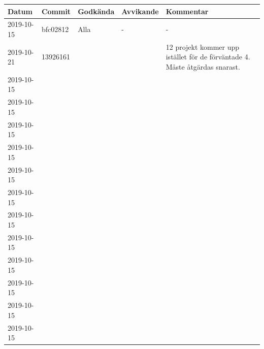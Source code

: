 \documentclass{TDP003mall}
\begin{document}
\begin{tabular}{|l|l|l|l|l|}
  \hline
  Datum & Commit & Godkända & Avvikande & Kommentar \\ [0.5ex]
  \hline
  2019-10-15 & bfc02812 & Alla & - & - \\
  \hline
  \hline
  2019-10-21 & 13926161 &  &  & 12 projekt kommer upp istället för de förväntade 4. Måste åtgärdas snarast.\\
  \hline
  \hline
  2019-10-15 &  &  &  & \\
  \hline
  \hline
  2019-10-15 &  &  &  & \\
  \hline
  \hline
  2019-10-15 &  &  &  & \\
  \hline
  \hline
  2019-10-15 &  &  &  & \\
  \hline
  \hline
  2019-10-15 &  &  &  & \\
  \hline
  \hline
  2019-10-15 &  &  &  & \\
  \hline
  \hline
  2019-10-15 &  &  &  & \\
  \hline
  \hline
  2019-10-15 &  &  &  & \\
  \hline
  \hline
  2019-10-15 &  &  &  & \\
  \hline
  \hline
  2019-10-15 &  &  &  & \\
  \hline
  \hline
  2019-10-15 &  &  &  & \\
  \hline
  \hline
  2019-10-15 &  &  &  & \\
  \hline
\end{tabular}





\end{document}
